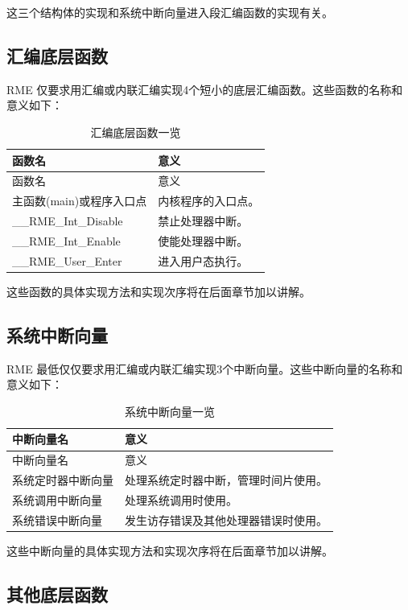 这三个结构体的实现和系统中断向量进入段汇编函数的实现有关。

\subsection{汇编底层函数}\label{subsec:7-assembly-low-level-functions}

RME 仅要求用汇编或内联汇编实现4个短小的底层汇编函数。这些函数的名称和意义如下：

\begin{xltabular}{\textwidth}{@{}>{\hsize\raggedright\arraybackslash}X>{\hsize\raggedright\arraybackslash}X@{}}
\caption{汇编底层函数一览}\label{tab:7-6-assembly-low-level-functions-overview}\\
\toprule
函数名 & 意义\tabularnewline
\endfirsthead
\toprule
函数名 & 意义\tabularnewline
\midrule
\endhead
\bottomrule
\endlastfoot
主函数(main)或程序入口点 & 内核程序的入口点。\tabularnewline
\_\_RME\_Int\_Disable & 禁止处理器中断。\tabularnewline
\_\_RME\_Int\_Enable & 使能处理器中断。\tabularnewline
\_\_RME\_User\_Enter & 进入用户态执行。\tabularnewline
\end{xltabular}

这些函数的具体实现方法和实现次序将在后面章节加以讲解。

\subsection{系统中断向量}\label{subsec:7-system-interrupt-vectors}

RME 最低仅仅要求用汇编或内联汇编实现3个中断向量。这些中断向量的名称和意义如下：

\begin{xltabular}{\textwidth}{@{}>{\hsize\raggedright\arraybackslash}X>{\hsize\raggedright\arraybackslash}X@{}}
\caption{系统中断向量一览}\label{tab:7-7-system-interrupt-vectors-overview}\\
\toprule
中断向量名 & 意义\tabularnewline
\endfirsthead
\toprule
中断向量名 & 意义\tabularnewline
\midrule
\endhead
\bottomrule
\endlastfoot
系统定时器中断向量 & 处理系统定时器中断，管理时间片使用。\tabularnewline
系统调用中断向量 & 处理系统调用时使用。\tabularnewline
系统错误中断向量 & 发生访存错误及其他处理器错误时使用。\tabularnewline
\end{xltabular}

这些中断向量的具体实现方法和实现次序将在后面章节加以讲解。

\subsection{其他底层函数}\label{subsec:7-other-low-level-functions}

